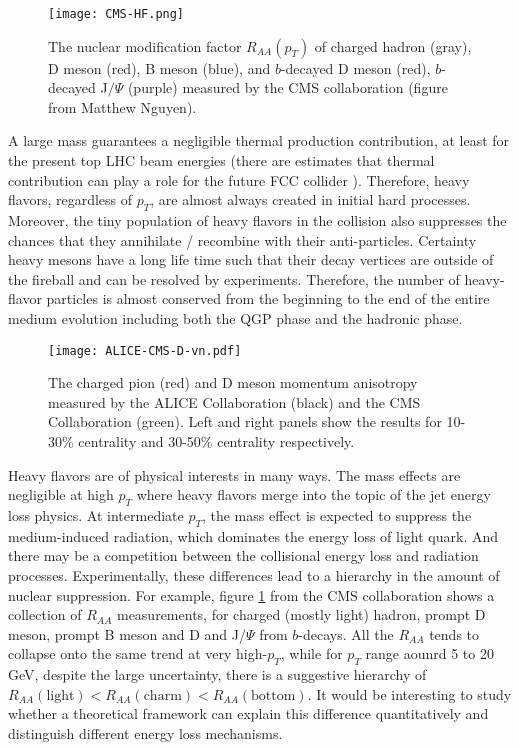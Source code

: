 \begin{figure}
\centering
\texttt{[image: CMS-HF.png]}
\caption{The nuclear modification factor $R_{AA}(p_T)$ of charged hadron (gray), D meson (red), B meson (blue), and $b$-decayed D meson (red), $b$-decayed J$/\Psi$ (purple) measured by the CMS collaboration \cite{Khachatryan:2016odn,Sirunyan:2017isk,Sirunyan:2017xss,Sirunyan:2017oug} (figure from Matthew Nguyen).}
\label{fig:intro:Raa}
\end{figure}

A large mass guarantees a negligible thermal production contribution, at least for the present top LHC beam energies (there are estimates that thermal contribution can play a role for the future FCC collider \cite{Zhou:2016wbo}).
Therefore, heavy flavors, regardless of $p_T$, are almost always created in initial hard processes.
Moreover, the tiny population of heavy flavors in the collision also suppresses the chances that they annihilate / recombine with their anti-particles.
Certainty heavy mesons have a long life time such that their decay vertices are outside of the fireball and can be resolved by experiments.
Therefore, the number of heavy-flavor particles is almost conserved from the beginning to the end of the entire medium evolution including both the QGP phase and the hadronic phase.

\begin{figure}
\centering
\texttt{[image: ALICE-CMS-D-vn.pdf]}
\caption{The charged pion (red) and D meson momentum anisotropy measured by the ALICE Collaboration (black) and the CMS Collaboration (green). Left and right panels show the results for 10-30\% centrality and 30-50\% centrality respectively.}
\label{fig:intro:D-vn}
\end{figure}

Heavy flavors are of physical interests in many ways.
The mass effects are negligible at high $p_T$ where heavy flavors merge into the topic of the jet energy loss physics.
At intermediate $p_T$, the mass effect is expected to suppress the medium-induced radiation, which dominates the energy loss of light quark.
And there may be a competition between the collisional energy loss and radiation processes.
Experimentally, these differences lead to a hierarchy in the amount of nuclear suppression.
For example, figure \ref{fig:intro:Raa} from the CMS collaboration shows a collection of $R_{AA}$ measurements, for charged (mostly light) hadron, prompt D meson, prompt B meson and D and J/$\Psi$ from $b$-decays.
All the $R_{AA}$ tends to collapse onto the same trend at very high-$p_T$, while for $p_T$ range aounrd 5 to 20 GeV, despite the large uncertainty, there is a suggestive hierarchy of $R_{AA}(\textrm{light}) < R_{AA}(\textrm{charm}) < R_{AA}(\textrm{bottom})$.
It would be interesting to study whether a theoretical framework can explain this difference quantitatively and distinguish different energy loss mechanisms.

